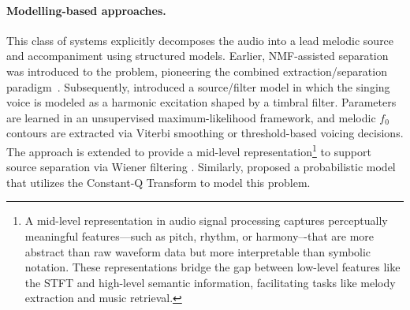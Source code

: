 \paragraph*{Modelling-based approaches.} This class of systems explicitly decomposes the audio into a lead melodic source and accompaniment using structured models. Earlier, NMF-assisted separation was introduced to the problem, pioneering the combined extraction/separation paradigm~\citep{durrieu-singer}.
%
Subsequently, \citep{durrieu-source_filter} introduced a source/filter model in which the singing voice is modeled as a harmonic excitation shaped by a timbral filter. Parameters are learned in an unsupervised maximum-likelihood framework, and melodic $f_0$ contours are extracted via Viterbi smoothing or threshold-based voicing decisions. The approach is extended to provide a mid-level representation\footnote{A mid-level representation in audio signal processing captures perceptually meaningful features—such as pitch, rhythm, or harmony–-that are more abstract than raw waveform data but more interpretable than symbolic notation. These representations bridge the gap between low-level features like the \acrshort{STFT} and high-level semantic information, facilitating tasks like melody extraction and music retrieval.} to support source separation via Wiener filtering \citep{durrieu-musically}. Similarly, \citep{fuentes-probabilistic} proposed a probabilistic model that utilizes the Constant-Q Transform to model this problem.






